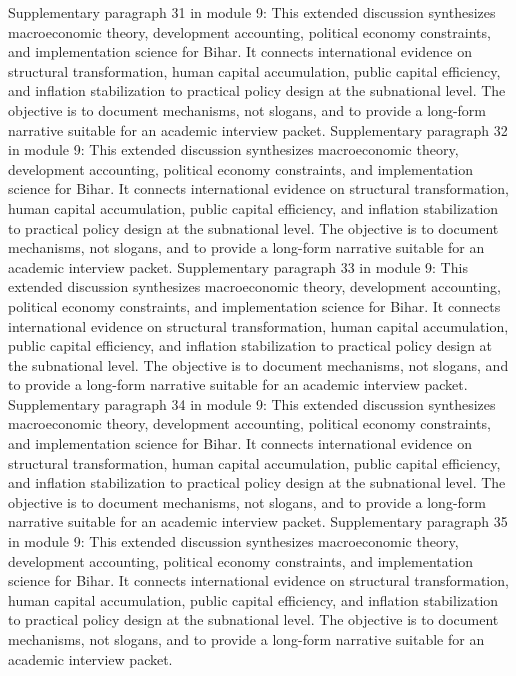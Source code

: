 \documentclass[preprint,12pt]{elsarticle}
\begin{document}
Supplementary paragraph 31 in module 9: This extended discussion synthesizes macroeconomic theory, development accounting, political economy constraints, and implementation science for Bihar. It connects international evidence on structural transformation, human capital accumulation, public capital efficiency, and inflation stabilization to practical policy design at the subnational level. The objective is to document mechanisms, not slogans, and to provide a long-form narrative suitable for an academic interview packet.
Supplementary paragraph 32 in module 9: This extended discussion synthesizes macroeconomic theory, development accounting, political economy constraints, and implementation science for Bihar. It connects international evidence on structural transformation, human capital accumulation, public capital efficiency, and inflation stabilization to practical policy design at the subnational level. The objective is to document mechanisms, not slogans, and to provide a long-form narrative suitable for an academic interview packet.
Supplementary paragraph 33 in module 9: This extended discussion synthesizes macroeconomic theory, development accounting, political economy constraints, and implementation science for Bihar. It connects international evidence on structural transformation, human capital accumulation, public capital efficiency, and inflation stabilization to practical policy design at the subnational level. The objective is to document mechanisms, not slogans, and to provide a long-form narrative suitable for an academic interview packet.
Supplementary paragraph 34 in module 9: This extended discussion synthesizes macroeconomic theory, development accounting, political economy constraints, and implementation science for Bihar. It connects international evidence on structural transformation, human capital accumulation, public capital efficiency, and inflation stabilization to practical policy design at the subnational level. The objective is to document mechanisms, not slogans, and to provide a long-form narrative suitable for an academic interview packet.
Supplementary paragraph 35 in module 9: This extended discussion synthesizes macroeconomic theory, development accounting, political economy constraints, and implementation science for Bihar. It connects international evidence on structural transformation, human capital accumulation, public capital efficiency, and inflation stabilization to practical policy design at the subnational level. The objective is to document mechanisms, not slogans, and to provide a long-form narrative suitable for an academic interview packet.
\end{document}
